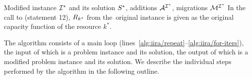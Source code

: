\begin{algorithm}[t]
\begin{algorithmic}[1]
\Output  Modified instance $\mathcal{I}^*$ and its solution $S^*$,
\Outputc additions $\mathcal{A}^{\mathcal{I}^*}$, migrations $\mathcal{M}^{\mathcal{I}^*}$
\Statex
\Note In the call to  (statement 12),
      $R_{k^*}$ from the~original instance is given as the original capacity function of the resource $k^*$.

\end{algorithmic}
\end{algorithm}

The algorithm consists of a main loop (lines~\ref{alg:iira/repeat}--\ref{alg:iira/for-iters}),
the input of which is a problem instance and its solution,
the output of which is a modified problem instance and its solution.
We describe the individual steps performed by the algorithm in the following outline.

